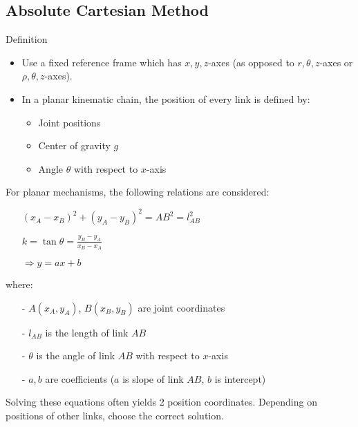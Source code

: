 \subsection{Absolute Cartesian Method}

\begin{frame}{Definition}
    \begin{itemize}
        \item Use a fixed reference frame which has $x,y,z$-axes (as opposed to $r,\theta,z$-axes or $\rho,\theta,z$-axes).
        \item In a planar kinematic chain, the position of every link is defined by:
        \begin{itemize}
            \item Joint positions
            \item Center of gravity $g$
            \item Angle $\theta$ with respect to $x$-axis
       \end{itemize}
    \end{itemize}
\end{frame}

\begin{frame}
For planar mechanisms, the following relations are considered:
	\begin{itemize}
	    \item[] $\displaystyle (x_A-x_B)^2+(y_A-y_B)^2=AB^2=l_{AB}^2$
	    \item[] $\displaystyle k=\tan{\theta}=\frac{y_B-y_A}{x_B-x_A}$
	    \item[] $\displaystyle\Rightarrow y=ax+b$
	\end{itemize}
where:
	\begin{itemize}
	    \item[-] $A(x_A,y_A)$, $B(x_B,y_B)$ are joint coordinates
	    \item[-] $l_{AB}$ is the length of link $AB$
	    \item[-] $\theta$ is the angle of link $AB$ with respect to $x$-axis
	    \item[-] $a,b$ are coefficients ($a$ is slope of link $AB$, $b$ is intercept)
	\end{itemize}
Solving these equations often yields 2 position coordinates. Depending on positions of other links, choose the correct solution.
\end{frame}